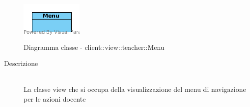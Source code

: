 \vspace{0.5cm}
\hypertarget{client::view::teacher::Menu}{}
\begin{center}
			\begin{figure}[H]
				\centering \includegraphics[scale=4, max width=\textwidth, max height=\myheight]{../img/diagrammiClassi/client/view/teacher/Menu.png}
				\caption{Diagramma classe - client::view::teacher::Menu}
			\end{figure}
		\end{center}\begin{description}
\item[Descrizione] \hfill \\
 La classe view che si occupa della visualizzazione del menu di navigazione per le azioni docente
\end{description}

